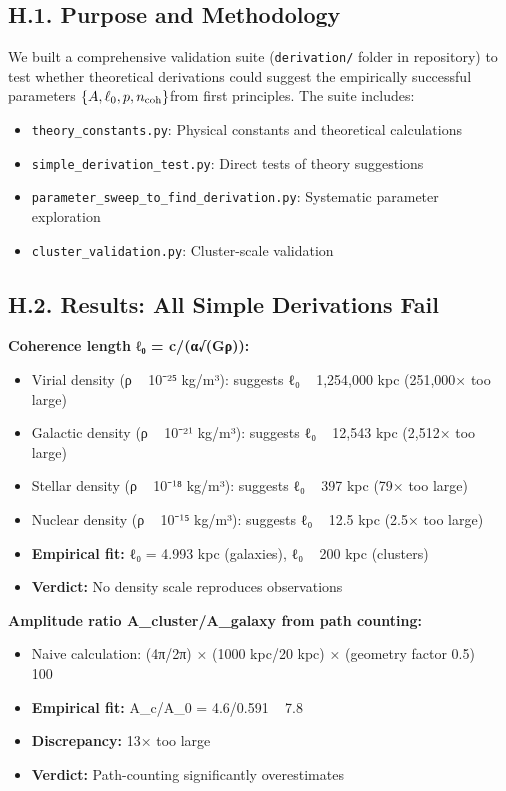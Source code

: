 \documentclass[11pt,a4paper]{article}
\begin{document}
\subsection{H.1. Purpose and Methodology}


We built a comprehensive validation suite (\texttt{derivation/} folder in repository) to test whether theoretical derivations could suggest the empirically successful parameters $\allowbreak \{A, \ell_0, p, n_{\rm coh}\}$\allowbreak  from first principles. The suite includes:


\begin{itemize}
\item \texttt{theory\_constants.py}: Physical constants and theoretical calculations
\item \texttt{simple\_derivation\_test.py}: Direct tests of theory suggestions
\item \texttt{parameter\_sweep\_to\_find\_derivation.py}: Systematic parameter exploration
\item \texttt{cluster\_validation.py}: Cluster-scale validation
\end{itemize}


\subsection{H.2. Results: All Simple Derivations Fail}


\textbf{Coherence length ℓ₀ = c/(α√(Gρ)):}

\begin{itemize}
\item Virial density (ρ ~ 10⁻²⁵ kg/m³): suggests ℓ₀ ~ 1,254,000 kpc (251,000× too large)
\item Galactic density (ρ ~ 10⁻²¹ kg/m³): suggests ℓ₀ ~ 12,543 kpc (2,512× too large)
\item Stellar density (ρ ~ 10⁻¹⁸ kg/m³): suggests ℓ₀ ~ 397 kpc (79× too large)
\item Nuclear density (ρ ~ 10⁻¹⁵ kg/m³): suggests ℓ₀ ~ 12.5 kpc (2.5× too large)
\item \textbf{Empirical fit:} ℓ₀ = 4.993 kpc (galaxies), ℓ₀ ~ 200 kpc (clusters)
\item \textbf{Verdict:} No density scale reproduces observations
\end{itemize}


\textbf{Amplitude ratio A\_cluster/A\_galaxy from path counting:}

\begin{itemize}
\item Naive calculation: (4π/2π) × (1000 kpc/20 kpc) × (geometry factor 0.5) ~ 100
\item \textbf{Empirical fit:} A\_c/A\_0 = 4.6/0.591 ~ 7.8
\item \textbf{Discrepancy:} 13× too large
\item \textbf{Verdict:} Path-counting significantly overestimates
\end{itemize}
\end{document}
